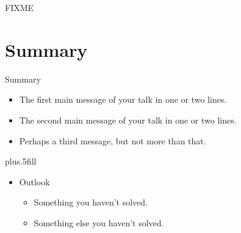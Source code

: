 \documentclass{beamer}
\begin{document}
\begin{frame}{FIXME}
\end{frame}


\section*{Summary}

\begin{frame}{Summary}

  \begin{itemize}
  \item
    The \alert{first main message} of your talk in one or two lines.
  \item
    The \alert{second main message} of your talk in one or two lines.
  \item
    Perhaps a \alert{third message}, but not more than that.
  \end{itemize}
  
  \vskip0pt plus.5fill
  \begin{itemize}
  \item
    Outlook
    \begin{itemize}
    \item
      Something you haven't solved.
    \item
      Something else you haven't solved.
    \end{itemize}
  \end{itemize}
\end{frame}
\end{document}
